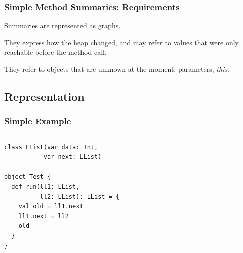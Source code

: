 \documentclass[hyperref={pdfpagelabels=false}]{beamer}
\begin{document}
\begin{frame}
\frametitle{Simple Method Summaries: Requirements}
  Summaries are represented as graphs.

  \vspace{15pt}
  They express how the heap changed, and may refer to values that were
  only reachable before the method call.

  \vspace{15pt}
  They refer to objects that are unknown at the moment: parameters, \emph{this}.

\end{frame}
\subsection{Representation}

\begin{frame}[fragile]
\frametitle{Simple Example}
  \begin{columns}
    \begin{column}{0.4\textwidth}
\begin{lstlisting}
class LList(var data: Int,
           var next: LList)

object Test {
  def run(ll1: LList,
          ll2: LList): LList = {
    val old = ll1.next
    ll1.next = ll2
    old
  }
}
\end{lstlisting}
    \end{column}
    \begin{column}{0.6\textwidth}
      \begin{figure}[t]
      \end{figure}
    \end{column}
  \end{columns}
\end{frame}
\end{document}
